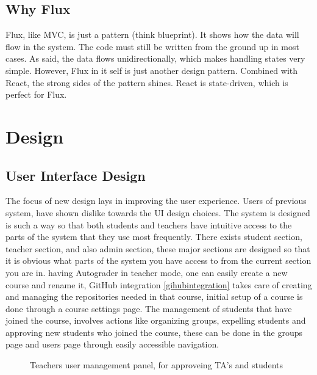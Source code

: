 \subsection{Why Flux}
Flux, like MVC, is just a pattern (think blueprint). It shows how the data will flow in the system. The code must still be written from the ground up in most cases. As said, the data flows unidirectionally, which makes handling states very simple. However, Flux in it self is just another design pattern. Combined with React, the strong sides of the pattern shines. React is state-driven, which is perfect for Flux.

\section{Design}
\subsection{User Interface Design}
The focus of new design lays in improving the user experience. Users of previous system, have shown dislike towards the UI design choices. The system is designed is such a way so that both students and teachers have intuitive access to the parts of the system that they use most frequently. There exists student section, teacher section, and also admin section, these major sections are designed so that it is obvious what parts of the system you have access to from the current section you are in. having Autograder in teacher mode, one can easily create a new course and rename it, GitHub integration \ref{gihubintegration} takes care of creating and managing the repositories needed in that course, initial setup of a course is done through a course settings page. The management of students that have joined the course, involves actions like organizing groups, expelling students and approving new students who joined the course, these can be done in the groups page and users page through easily accessible navigation.
\begin{figure}[h]
  \caption{Teachers user management panel, for approveing TA's and students}
  \label{fig:teacherpage}
\end{figure}

